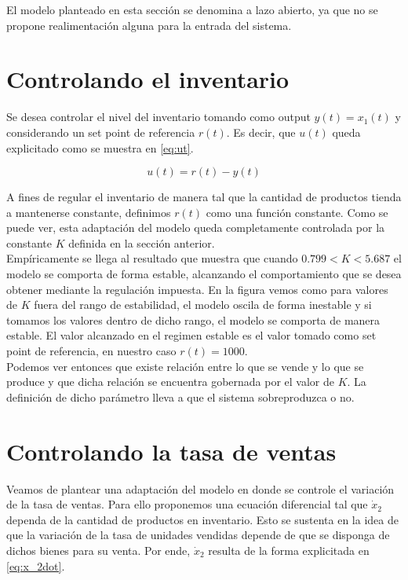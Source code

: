 \documentclass{sig-alternate}
\begin{document}
El modelo planteado en esta sección se denomina a lazo abierto, ya que no se propone realimentación alguna para la entrada del sistema.

\section{Controlando el inventario}
\label{inventary_control_section} 
Se desea controlar el nivel del inventario tomando como output $y(t)=x_{1}(t)$ y considerando
un set point de referencia $r(t)$. Es decir, que $u(t)$ queda explicitado como se muestra en \eqref{eq:ut}.

\begin{equation}
u(t)=r(t)-y(t)\label{eq:ut}\end{equation}

A fines de regular el inventario de manera tal que la cantidad de productos tienda a mantenerse constante, definimos $r(t)$ como una función
constante.
Como se puede ver, esta adaptación del modelo queda completamente controlada por la constante $K$ definida en la sección anterior.\\
Empíricamente se llega al resultado que muestra que cuando $0.799 < K < 5.687$ el modelo se comporta de forma estable, alcanzando el comportamiento
que se desea obtener mediante la regulación impuesta. En la figura vemos como para valores de $K$ fuera del rango de estabilidad, el modelo oscila de
forma inestable y si tomamos los valores dentro de dicho rango, el modelo se comporta de manera estable. El valor alcanzado en el regimen estable
es el valor tomado como set point de referencia, en nuestro caso $r(t) = 1000$.\\
Podemos ver entonces que existe relación entre lo que se vende y lo que se produce y que dicha relación se encuentra gobernada por el valor de
$K$. La definición de dicho parámetro lleva a que el sistema sobreproduzca o no.
    
\section{Controlando la tasa de ventas}
\label{salesrate_control_section}
Veamos de plantear una adaptación del modelo en donde se controle el variación de la tasa de ventas. Para ello proponemos una ecuación diferencial
tal que $\dot{x}_{2}$ dependa de la cantidad de productos en inventario. Esto se sustenta en la idea de que la variación de la tasa de unidades
vendidas depende de que se disponga de dichos bienes para su venta. Por ende, $\dot{x}_{2}$ resulta de la forma explicitada en \eqref{eq:x_2dot}.
\end{document}
